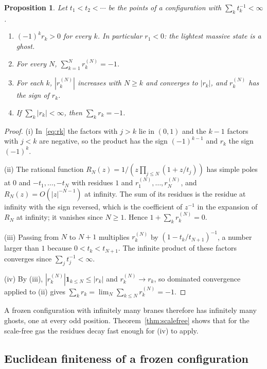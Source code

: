 \documentclass[aps,prd,twocolumn,superscriptaddress,nofootinbib,longbibliography,floatfix,amsmath,amssymb,10pt]{revtex4-2}
\newtheorem{proposition}[theorem]{Proposition}
\theoremstyle{definition}
\theoremstyle{remark}
\begin{document}
\begin{proposition}\label{prop:residues}
Let $t_1<t_2<\cdots$ be the points of a configuration with
$\sum_kt_k^{-1}<\infty$.
\begin{enumerate}[label=(\roman*),leftmargin=*,itemsep=1pt]
\item $(-1)^kr_k>0$ for every $k$. In particular $r_1<0$: the lightest massive
state is a ghost.
\item For every $N$, $\sum_{k=1}^Nr_k^{(N)}=-1$.
\item For each $k$, $|r_k^{(N)}|$ increases with $N\ge k$ and converges to
$|r_k|$, and $r_k^{(N)}$ has the sign of $r_k$.
\item If $\sum_k|r_k|<\infty$, then $\sum_kr_k=-1$.
\end{enumerate}
\end{proposition}

\begin{proof}
(i) In~\eqref{eq:rk} the factors with $j>k$ lie in $(0,1)$ and the $k-1$
factors with $j<k$ are negative, so the product has the sign $(-1)^{k-1}$ and
$r_k$ the sign $(-1)^k$.

(ii) The rational function $R_N(z)=1/(z\prod_{j\le N}(1+z/t_j))$ has simple
poles at $0$ and $-t_1,\dots,-t_N$ with residues $1$ and
$r_1^{(N)},\dots,r_N^{(N)}$, and $R_N(z)=O(|z|^{-N-1})$ at infinity. The sum
of its residues is the residue at infinity with the sign reversed, which is
the coefficient of $z^{-1}$ in the expansion of $R_N$ at infinity; it vanishes
since $N\ge1$. Hence $1+\sum_kr_k^{(N)}=0$.

(iii) Passing from $N$ to $N+1$ multiplies $r_k^{(N)}$ by
$(1-t_k/t_{N+1})^{-1}$, a number larger than $1$ because
$0<t_k<t_{N+1}$. The infinite product of these factors converges since
$\sum_jt_j^{-1}<\infty$.

(iv) By (iii), $|r_k^{(N)}|\mathbf 1_{k\le N}\le|r_k|$ and
$r_k^{(N)}\to r_k$, so dominated convergence applied to (ii) gives
$\sum_kr_k=\lim_N\sum_{k\le N}r_k^{(N)}=-1$.
\end{proof}

A frozen configuration with infinitely many branes therefore has infinitely
many ghosts, one at every odd position. Theorem~\ref{thm:scalefree} shows that
for the scale-free gas the residues decay fast enough for (iv) to apply.

\subsection{Euclidean finiteness of a frozen configuration}
\end{document}
